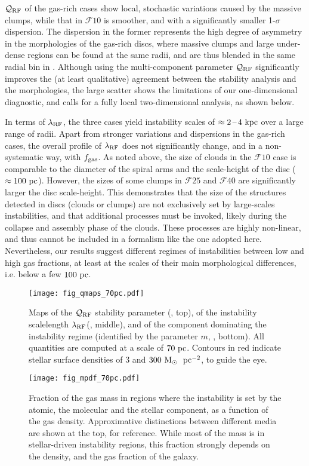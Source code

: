 \documentclass[useAMS,usenatbib]{mnras}
\newcommand{\fgas}{\ensuremath{f_{\rm gas}}\xspace}
\newcommand{\qrf}{\ensuremath{\mathcal{Q}_{\rm RF}}\xspace}
\newcommand{\lrf}{\ensuremath{\lambda_{\rm RF}}\xspace}
\newcommand{\gs}{\ensuremath{\mathcal{F}10}\xspace}
\newcommand{\gm}{\ensuremath{\mathcal{F}25}\xspace}
\newcommand{\gl}{\ensuremath{\mathcal{F}40}\xspace}
\begin{document}
\qrf of the gas-rich cases show local, stochastic variations caused by the massive clumps, while that in \gs is smoother, and with a significantly smaller 1-$\sigma$ dispersion. The dispersion in the former represents the high degree of asymmetry in the morphologies of the gas-rich discs, where massive clumps and large under-dense regions can be found at the same radii, and are thus blended in the same radial bin in . Although using the multi-component parameter $\qrf$ significantly improves the (at least qualitative) agreement between the stability analysis and the morphologies, the large scatter shows the limitations of our one-dimensional diagnostic, and calls for a fully local two-dimensional analysis, as shown below.

In terms of \lrf, the three cases yield instability scales of $\approx 2\textrm{\,--\,} 4 \mathrm{~kpc}$ over a large range of radii. Apart from stronger variations and dispersions in the gas-rich cases, the overall profile of \lrf does not significantly change, and in a non-systematic way, with \fgas. As noted above, the size of clouds in the \gs case is comparable to the diameter of the spiral arms and the scale-height of the disc ($\approx 100 \mathrm{~pc}$). However, the sizes of some clumps in \gm and \gl are significantly larger the disc scale-height. This demonstrates that the size of the structures detected in discs (clouds or clumps) are not exclusively set by large-scales instabilities, and that additional processes must be invoked, likely during the collapse and assembly phase of the clouds. These processes are highly non-linear, and thus cannot be included in a formalism like the one adopted here. Nevertheless, our results suggest different regimes of instabilities between low and high gas fractions, at least at the scales of their main morphological differences, i.e. below a few $100 \mathrm{~pc}$.

\begin{figure*}
\centering
\texttt{[image: fig\_qmaps\_70pc.pdf]}
\caption{Maps of the \qrf stability parameter (, top), of the instability scalelength \lrf (, middle), and of the component dominating the instability regime (identified by the parameter $m$, , bottom). All quantities are computed at a scale of $70\mathrm{~pc}$. Contours in red indicate stellar surface densities of 3 and $300 \Msun\ \pc^{-2}$, to guide the eye.}
\label{fig:qmaps}
\end{figure*}

\begin{figure}
\centering
\texttt{[image: fig\_mpdf\_70pc.pdf]}
\caption{Fraction of the gas mass in regions where the instability is set by the atomic, the molecular and the stellar component, as a function of the gas density. Approximative distinctions between different media are shown at the top, for reference. While most of the mass is in stellar-driven instability regions, this fraction strongly depends on the density, and the gas fraction of the galaxy.}
\label{fig:mpdf}
\end{figure}
\end{document}
